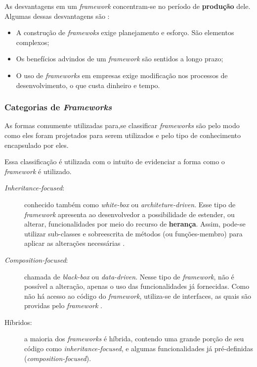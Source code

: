 As desvantagens em um \textit{framework} concentram-se no período de
\textbf{produção} dele. Algumas dessas desvantagens são \cite{barretoJunior2006}
\cite{sauve2006}:
\begin{itemize}
\item A construção de \textit{framewoks} exige planejamento e esforço. São
elementos complexos;
\item Os benefícios advindos de um \textit{framework} são sentidos a longo prazo;
\item O uso de \textit{frameworks} em empresas exige modificação nos processos de
desenvolvimento, o que custa dinheiro e tempo.
\end{itemize}
\par

\subsubsection{Categorias de \textit{Frameworks}}
As formas comumente utilizadas para,se classificar \textit{frameworks} são pelo
modo como eles foram projetados para serem utilizados e pelo tipo de conhecimento
encapsulado por eles.

Essa classificação é utilizada com o intuito de evidenciar a forma como o
\textit{framework} é utilizado.
\begin{description}
\item[\textit{Inheritance-focused}:] conhecido também como \textit{white-box} ou
\textit{architeture-driven}. Esse tipo de \textit{framework} apresenta ao
desenvolvedor a possibilidade de estender, ou alterar, funcionalidades por meio
do recurso de \textbf{herança}. Assim, pode-se utilizar sub-classes e
sobreescrita de métodos (ou funções-membro) para aplicar as alterações necessárias
\cite{sauve2006}.
\item[\textit{Composition-focused}:] chamada de \textit{black-box} ou \textit{data-driven}.
Nesse tipo de \textit{framework}, não é possível a alteração, apenas o uso das
funcionalidades já fornecidas. Como não há acesso ao código do \textit{framework},
utiliza-se de interfaces, as quais são providas pelo \textit{framework} \cite{sauve2006}.
\item[Híbridos:] a maioria dos \textit{frameworks} é híbrida, contendo uma
grande porção de seu código como \textit{inheritance-focused}, e algumas
funcionalidades já pré-definidas (\textit{composition-focused}).
\end{description}

